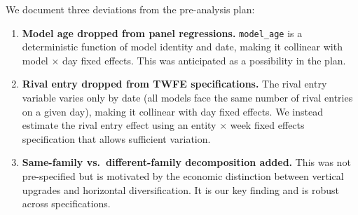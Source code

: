 \documentclass[11pt, a4paper]{article}
\begin{document}
\begin{appendices}
We document three deviations from the pre-analysis plan:
\begin{enumerate}[nosep]
\item \textbf{Model age dropped from panel regressions.} \texttt{model\_age} is a deterministic function of model identity and date, making it collinear with model $\times$ day fixed effects. This was anticipated as a possibility in the plan.
\item \textbf{Rival entry dropped from TWFE specifications.} The rival entry variable varies only by date (all models face the same number of rival entries on a given day), making it collinear with day fixed effects. We instead estimate the rival entry effect using an entity $\times$ week fixed effects specification that allows sufficient variation.
\item \textbf{Same-family vs.\ different-family decomposition added.} This was not pre-specified but is motivated by the economic distinction between vertical upgrades and horizontal diversification. It is our key finding and is robust across specifications.
\end{enumerate}

\end{appendices}
\end{document}
